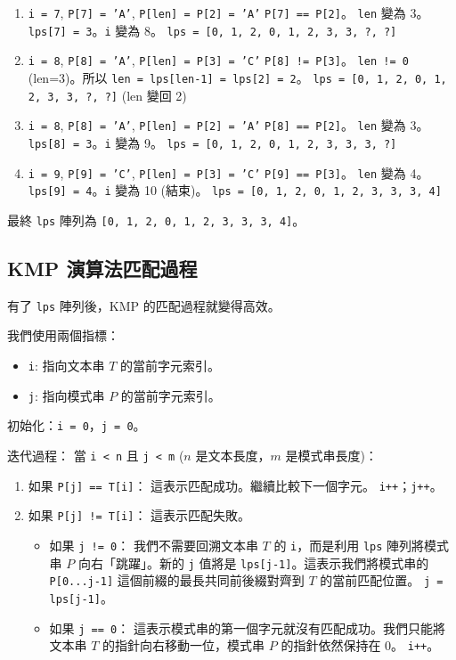 \begin{enumerate}
    \item \texttt{i = 7}, \texttt{P[7] = 'A'}, \texttt{P[len] = P[2] = 'A'}
    \texttt{P[7] == P[2]}。
    \texttt{len} 變為 3。\texttt{lps[7] = 3}。\texttt{i} 變為 8。
    \texttt{lps = [0, 1, 2, 0, 1, 2, 3, 3, ?, ?]}

    \item \texttt{i = 8}, \texttt{P[8] = 'A'}, \texttt{P[len] = P[3] = 'C'}
    \texttt{P[8] != P[3]}。
    \texttt{len != 0} (len=3)。所以 \texttt{len = lps[len-1] = lps[2] = 2}。
    \texttt{lps = [0, 1, 2, 0, 1, 2, 3, 3, ?, ?]} (len 變回 2)

    \item \texttt{i = 8}, \texttt{P[8] = 'A'}, \texttt{P[len] = P[2] = 'A'}
    \texttt{P[8] == P[2]}。
    \texttt{len} 變為 3。\texttt{lps[8] = 3}。\texttt{i} 變為 9。
    \texttt{lps = [0, 1, 2, 0, 1, 2, 3, 3, 3, ?]}

    \item \texttt{i = 9}, \texttt{P[9] = 'C'}, \texttt{P[len] = P[3] = 'C'}
    \texttt{P[9] == P[3]}。
    \texttt{len} 變為 4。\texttt{lps[9] = 4}。\texttt{i} 變為 10 (結束)。
    \texttt{lps = [0, 1, 2, 0, 1, 2, 3, 3, 3, 4]}
\end{enumerate}

最終 \verb|lps| 陣列為 \verb|[0, 1, 2, 0, 1, 2, 3, 3, 3, 4]|。

\subsection{KMP 演算法匹配過程}
有了 \verb|lps| 陣列後，KMP 的匹配過程就變得高效。

我們使用兩個指標：
\begin{itemize}
    \item \verb|i|: 指向文本串 $T$ 的當前字元索引。
    \item \verb|j|: 指向模式串 $P$ 的當前字元索引。
\end{itemize}

初始化：\verb|i = 0|，\verb|j = 0|。

迭代過程：
當 \verb|i < n| 且 \verb|j < m| ($n$ 是文本長度，$m$ 是模式串長度)：
\begin{enumerate}
    \item 如果 \verb|P[j] == T[i]|：
    這表示匹配成功。繼續比較下一個字元。
    \verb|i++|；\verb|j++|。
    \item 如果 \verb|P[j] != T[i]|：
    這表示匹配失敗。
    \begin{itemize}
        \item 如果 \verb|j != 0|：
            我們不需要回溯文本串 $T$ 的 \verb|i|，而是利用 \verb|lps| 陣列將模式串 $P$ 向右「跳躍」。新的 \verb|j| 值將是 \verb|lps[j-1]|。這表示我們將模式串的 \verb|P[0...j-1]| 這個前綴的最長共同前後綴對齊到 $T$ 的當前匹配位置。
            \verb|j = lps[j-1]|。
        \item 如果 \verb|j == 0|：
            這表示模式串的第一個字元就沒有匹配成功。我們只能將文本串 $T$ 的指針向右移動一位，模式串 $P$ 的指針依然保持在 0。
            \verb|i++|。
    \end{itemize}
\end{enumerate}

